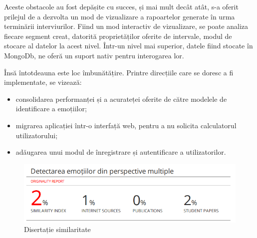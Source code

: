 \documentclass[a4paper, 12pt]{report}
\begin{document}
	Aceste obstacole au fost depășite cu succes, și mai mult decât atât, s-a oferit prilejul de a dezvolta un mod de vizualizare a 	rapoartelor generate în urma terminării interviurilor. Fiind un mod interactiv de vizualizare, se poate analiza fiecare segment creat, datorită proprietăților oferite de intervale, modul de stocare al datelor la acest nivel. Într-un nivel mai superior, datele fiind stocate în MongoDb, ne oferă un suport nativ pentru interogarea lor.

	Însă întotdeauna este loc îmbunătățire. Printre direcțiile care se doresc a fi implementate, se vizează:
	
	\begin{itemize}
		\item consolidarea performanței și a acurateței oferite de către modelele de identificare a emoțiilor;
		\item migrarea aplicației într-o interfață web, pentru a nu solicita calculatorul utilizatorului;
		\item adăugarea unui modul de înregistrare și autentificare a utilizatorilor.
	\end{itemize}
	
	\clearpage
    \printbibliography
    \clearpage
	\begin{figure}[H]
		\begin{center}
			\includegraphics[scale=0.8]{images/plagiat.PNG}
		\end{center}
		\caption{Disertație similaritate}
		\label{fig:sim}
	\end{figure} 	
\end{document}
